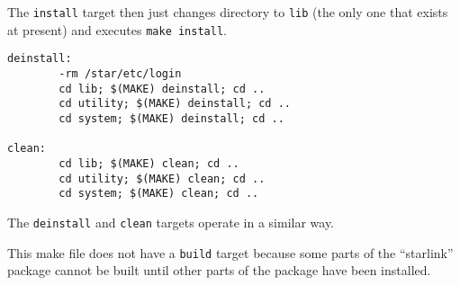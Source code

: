 The {\tt install} target then just changes directory to {\tt lib} (the only
one that exists at present) and executes {\tt make install}.

\begin{verbatim}
deinstall:
        -rm /star/etc/login
        cd lib; $(MAKE) deinstall; cd ..
        cd utility; $(MAKE) deinstall; cd ..
        cd system; $(MAKE) deinstall; cd ..

clean:
        cd lib; $(MAKE) clean; cd ..
        cd utility; $(MAKE) clean; cd ..
        cd system; $(MAKE) clean; cd ..
\end{verbatim}
The {\tt deinstall} and {\tt clean} targets operate in a similar way.

This make file does not have a {\tt build} target because some parts of the
``starlink'' package cannot be built until other parts of the package have
been installed.
